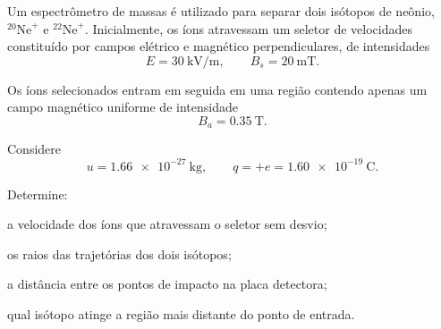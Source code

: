 
\begin{questao}[4]{}

Um espectrômetro de massas é utilizado para separar dois isótopos de neônio,
$^{20}\mathrm{Ne}^{+}$ e $^{22}\mathrm{Ne}^{+}$. Inicialmente, os íons
atravessam um seletor de velocidades constituído por campos elétrico e
magnético perpendiculares, de intensidades
\[
E=\SI{30}{\kilo\volt\per\meter},
\qquad
B_s=\SI{20}{\milli\tesla}.
\]

Os íons selecionados entram em seguida em uma região contendo apenas um campo
magnético uniforme de intensidade
\[
B_a=\SI{0.35}{\tesla}.
\]

Considere
\[
u=\SI{1.66e-27}{\kilogram},
\qquad
q=+e=\SI{1.60e-19}{\coulomb}.
\]

Determine:

\begin{itensq}
    \item a velocidade dos íons que atravessam o seletor sem desvio;
    \item os raios das trajetórias dos dois isótopos;
    \item a distância entre os pontos de impacto na placa detectora;
    \item qual isótopo atinge a região mais distante do ponto de entrada.
\end{itensq}

\begin{center}
\end{center}
\end{questao}
